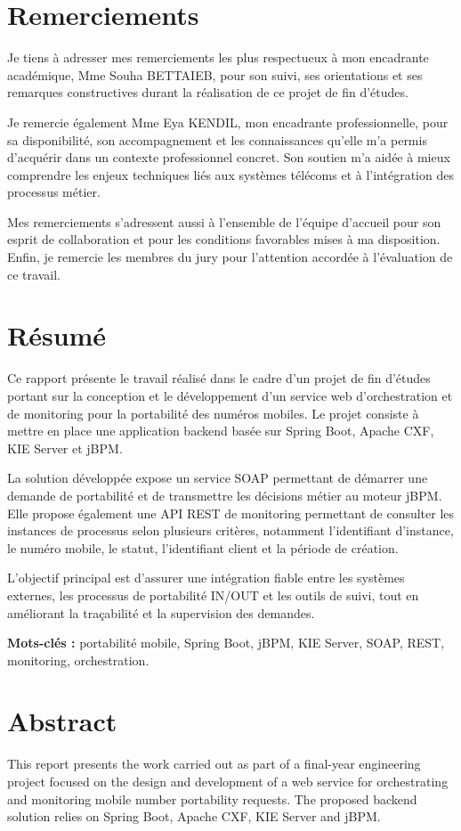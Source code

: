\documentclass[12pt,a4paper]{report}
\begin{document}
\chapter*{Remerciements}
Je tiens à adresser mes remerciements les plus respectueux à mon encadrante académique, Mme Souha BETTAIEB, pour son suivi, ses orientations et ses remarques constructives durant la réalisation de ce projet de fin d'études.

Je remercie également Mme Eya KENDIL, mon encadrante professionnelle, pour sa disponibilité, son accompagnement et les connaissances qu'elle m'a permis d'acquérir dans un contexte professionnel concret. Son soutien m'a aidée à mieux comprendre les enjeux techniques liés aux systèmes télécoms et à l'intégration des processus métier.

Mes remerciements s'adressent aussi à l'ensemble de l'équipe d'accueil pour son esprit de collaboration et pour les conditions favorables mises à ma disposition. Enfin, je remercie les membres du jury pour l'attention accordée à l'évaluation de ce travail.

\chapter*{Résumé}
Ce rapport présente le travail réalisé dans le cadre d'un projet de fin d'études portant sur la conception et le développement d'un service web d'orchestration et de monitoring pour la portabilité des numéros mobiles. Le projet consiste à mettre en place une application backend basée sur Spring Boot, Apache CXF, KIE Server et jBPM.

La solution développée expose un service SOAP permettant de démarrer une demande de portabilité et de transmettre les décisions métier au moteur jBPM. Elle propose également une API REST de monitoring permettant de consulter les instances de processus selon plusieurs critères, notamment l'identifiant d'instance, le numéro mobile, le statut, l'identifiant client et la période de création.

L'objectif principal est d'assurer une intégration fiable entre les systèmes externes, les processus de portabilité IN/OUT et les outils de suivi, tout en améliorant la traçabilité et la supervision des demandes.

\textbf{Mots-clés :} portabilité mobile, Spring Boot, jBPM, KIE Server, SOAP, REST, monitoring, orchestration.

\chapter*{Abstract}
This report presents the work carried out as part of a final-year engineering project focused on the design and development of a web service for orchestrating and monitoring mobile number portability requests. The proposed backend solution relies on Spring Boot, Apache CXF, KIE Server and jBPM.
\end{document}
